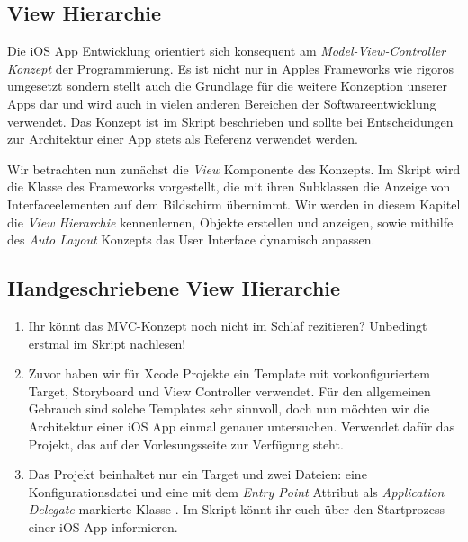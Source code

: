 \documentclass[parskip=half, final]{scrreprt}
\begin{document}
\begin{lecture} %


\chapter{View Hierarchie}

Die iOS App Entwicklung orientiert sich konsequent am \emph{Model-View-Controller Konzept} der Programmierung. Es ist nicht nur in Apples Frameworks wie  rigoros umgesetzt sondern stellt auch die Grundlage für die weitere Konzeption unserer Apps dar und wird auch in vielen anderen Bereichen der Softwareentwicklung verwendet. Das Konzept ist im Skript beschrieben und sollte bei Entscheidungen zur Architektur einer App stets als Referenz verwendet werden.


Wir betrachten nun zunächst die \emph{View} Komponente des Konzepts. Im Skript wird die  Klasse des  Frameworks vorgestellt, die mit ihren Subklassen die Anzeige von Interfaceelementen auf dem Bildschirm übernimmt. Wir werden in diesem Kapitel die \emph{View Hierarchie} kennenlernen,  Objekte erstellen und anzeigen, sowie mithilfe des \emph{Auto Layout} Konzepts das User Interface dynamisch anpassen.



\section{Handgeschriebene View Hierarchie}

\mvcindicatorview


\begin{enumerate}
\item Ihr könnt das MVC-Konzept noch nicht im Schlaf rezitieren? Unbedingt erstmal im Skript nachlesen!
\item Zuvor haben wir für Xcode Projekte ein Template mit vorkonfiguriertem Target, Storyboard und View Controller verwendet. Für den allgemeinen Gebrauch sind solche Templates sehr sinnvoll, doch nun möchten wir die Architektur einer iOS App einmal genauer untersuchen. Verwendet dafür das  Projekt, das auf der Vorlesungsseite zur Verfügung steht.
\item Das Projekt beinhaltet nur ein Target  und zwei Dateien: eine Konfigurationsdatei  und eine mit dem \emph{Entry Point} Attribut  als \emph{Application Delegate} markierte Klasse . Im Skript könnt ihr euch über den Startprozess einer iOS App informieren.


\end{enumerate}
\end{lecture}
\end{document}
